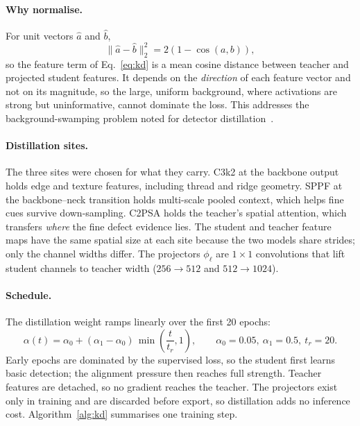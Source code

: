 \paragraph{Why normalise.} For unit vectors $\hat a$ and $\hat b$,
\begin{equation}
    \|\hat a-\hat b\|_2^2 = 2\left(1-\cos(a,b)\right),
    \label{eq:cosine}
\end{equation}
so the feature term of Eq.~\eqref{eq:kd} is a mean cosine distance between teacher and projected student features. It depends on the \emph{direction} of each feature vector and not on its magnitude, so the large, uniform background, where activations are strong but uninformative, cannot dominate the loss. This addresses the background-swamping problem noted for detector distillation~\cite{wang2019fgfi}.

\paragraph{Distillation sites.} The three sites were chosen for what they carry. C3k2 at the backbone output holds edge and texture features, including thread and ridge geometry. SPPF at the backbone--neck transition holds multi-scale pooled context, which helps fine cues survive down-sampling. C2PSA holds the teacher's spatial attention, which transfers \emph{where} the fine defect evidence lies. The student and teacher feature maps have the same spatial size at each site because the two models share strides; only the channel widths differ. The projectors $\phi_\ell$ are $1{\times}1$ convolutions that lift student channels to teacher width ($256\rightarrow512$ and $512\rightarrow1024$).

\paragraph{Schedule.} The distillation weight ramps linearly over the first 20 epochs:
\begin{equation}
    \alpha(t) = \alpha_0 + (\alpha_1-\alpha_0)\,\min\!\left(\frac{t}{t_r},1\right),\qquad \alpha_0=0.05,\ \alpha_1=0.5,\ t_r=20.
    \label{eq:ramp}
\end{equation}
Early epochs are dominated by the supervised loss, so the student first learns basic detection; the alignment pressure then reaches full strength. Teacher features are detached, so no gradient reaches the teacher. The projectors exist only in training and are discarded before export, so distillation adds no inference cost. Algorithm~\ref{alg:kd} summarises one training step.

